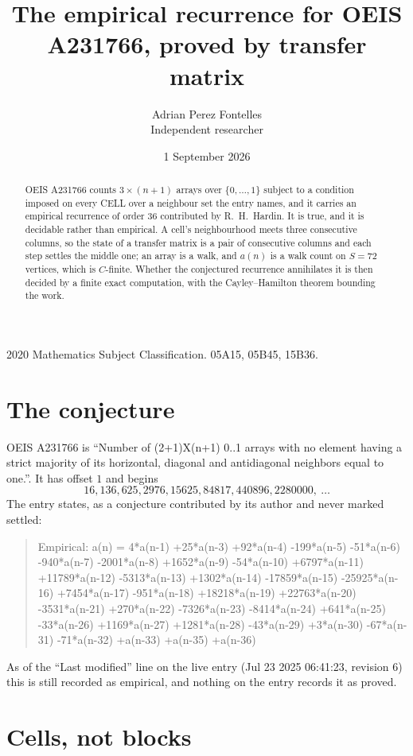 \documentclass[11pt,a4paper]{article}
\title{The empirical recurrence for OEIS A231766, proved by transfer matrix}
\author{Adrian Perez Fontelles\\ \small Independent researcher}
\date{1 September 2026}
\theoremstyle{plain}
\theoremstyle{definition}
\begin{document}
\maketitle

\begin{abstract}
OEIS A231766 counts $3\times(n+1)$ arrays over $\{0,\dots,1\}$ subject to a condition imposed on
every CELL over a neighbour set the entry names, and it carries an empirical recurrence of
order $36$ contributed by R.~H.~Hardin. It is true, and it is decidable rather than
empirical. A cell's neighbourhood meets three consecutive columns, so the state of a transfer
matrix is a pair of consecutive columns and each step settles the middle one; an array is a
walk, and $a(n)$ is a walk count on $S=72$ vertices, which is $C$-finite. Whether the
conjectured recurrence annihilates it is then decided by a finite exact computation, with the
Cayley--Hamilton theorem bounding the work.
\end{abstract}

\noindent\small 2020 Mathematics Subject Classification. 05A15, 05B45, 15B36.\normalsize

\section{The conjecture}

OEIS A231766 is ``Number of (2+1)X(n+1) 0..1 arrays with no element having a strict majority of its horizontal, diagonal and antidiagonal neighbors equal to one.''. It has offset $1$ and begins
\[
16, 136, 625, 2976, 15625, 84817, 440896, 2280000,\ \dots
\]
The entry states, as a conjecture contributed by its author and never marked settled:
\begin{quote}
Empirical: a(n) = 4*a(n-1) +25*a(n-3) +92*a(n-4) -199*a(n-5) -51*a(n-6) -940*a(n-7) -2001*a(n-8) +1652*a(n-9) -54*a(n-10) +6797*a(n-11) +11789*a(n-12) -5313*a(n-13) +1302*a(n-14) -17859*a(n-15) -25925*a(n-16) +7454*a(n-17) -951*a(n-18) +18218*a(n-19) +22763*a(n-20) -3531*a(n-21) +270*a(n-22) -7326*a(n-23) -8414*a(n-24) +641*a(n-25) -33*a(n-26) +1169*a(n-27) +1281*a(n-28) -43*a(n-29) +3*a(n-30) -67*a(n-31) -71*a(n-32) +a(n-33) +a(n-35) +a(n-36)
\end{quote}
As of the ``Last modified'' line on the live entry (Jul 23 2025 06:41:23, revision 6) this is still
recorded as empirical, and nothing on the entry records it as proved.

\section{Cells, not blocks}
\end{document}

